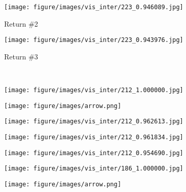 \begin{figure*}[t]
\begin{subfigure}[b]{.095\linewidth}
\end{subfigure} 
\begin{subfigure}[b]{.095\linewidth}
    \centering
    \caption{Return \#2}
    \vspace{-2mm}
    \texttt{[image: figure/images/vis\_inter/223\_0.946089.jpg]}
\end{subfigure} 
\begin{subfigure}[b]{.095\linewidth}
    \centering
    \caption{Return \#3}
    \vspace{-2mm}
    \texttt{[image: figure/images/vis\_inter/223\_0.943976.jpg]}
\end{subfigure} 
\\
  \begin{subfigure}[b]{.095\linewidth}
    \centering
    \texttt{[image: figure/images/vis\_inter/212\_1.000000.jpg]}
  \end{subfigure}\hspace{-1mm}
  \begin{subfigure}[b]{0.095\linewidth}
    \centering
    \texttt{[image: figure/images/arrow.png]}
  \end{subfigure} \hspace{-2mm} 
  \begin{subfigure}[b]{.095\linewidth}
    \centering
    \texttt{[image: figure/images/vis\_inter/212\_0.962613.jpg]}
  \end{subfigure}  
   \begin{subfigure}[b]{.095\linewidth}
    \centering
    \texttt{[image: figure/images/vis\_inter/212\_0.961834.jpg]}
  \end{subfigure} 
  \begin{subfigure}[b]{.095\linewidth}
    \centering
     \texttt{[image: figure/images/vis\_inter/212\_0.954690.jpg]}
  \end{subfigure} \hspace{5mm}
   \begin{subfigure}[b]{.095\linewidth}
    \centering
    \texttt{[image: figure/images/vis\_inter/186\_1.000000.jpg]}
  \end{subfigure}\hspace{-1mm} 
  \begin{subfigure}[b]{0.095\linewidth}
    \centering
    \texttt{[image: figure/images/arrow.png]}
  \end{subfigure}  \hspace{-2mm} 

\end{figure*}
